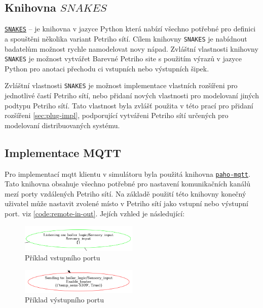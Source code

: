 \subsection{Knihovna $SNAKES$}

\href{https://www.ibisc.univ-evry.fr/~fpommereau/SNAKES/}{\texttt{SNAKES}} -- je knihovna v jazyce Python která nabízí všechno potřebné pro definici a spouštěni několika variant Petriho sítí. Cílem knihovny \texttt{SNAKES} je nabídnout badatelům možnost rychle namodelovat novy nápad. Zvláštní vlastnosti knihovny \texttt{SNAKES} je možnost vytvářet Barevné Petriho site s použitím výrazů v jazyce Python pro anotaci přechodu ci vstupních nebo výstupních šipek. \cite{snakes}

Zvláštní vlastnosti \texttt{SNAKES} je možnost implementace vlastních rozšířeni pro jednotlivé častí Petriho sítí, nebo přidaní nových vlastnosti pro modelovaní jiných podtypu Petriho sítí. Tato vlastnost byla zvlášť použita v této prací pro přidaní rozšířeni \ref{sec:plug-impl}, podporující vytvářeni Petriho sítí určených pro modelovaní distribuovaných systému.

\subsection{Implementace MQTT}
\label{subsec:mqtt_impl}
Pro implementací mqtt klientu v simulátoru byla použitá knihovna \href{https://pypi.org/project/paho-mqtt/}{\texttt{paho-mqtt}}. Tato knihovna obsahuje všechno potřebné pro nastavení komunikačních kanálů mezí porty vzdálených Petriho sítí. Na základě použití této knihovny konečný uživatel může nastavit zvolené místo v Petriho sítí jako vstupní nebo výstupní port. viz \ref{code:remote-in-out}. Jejích vzhled je následující:
\begin{figure}[hbt]
  \centering
  \includegraphics[width=0.5\textwidth]{obrazky-figures/port-in.png}
  \caption{Příklad vstupního portu}
  \label{port-in}
\end{figure}

\begin{figure}[hbt]
  \centering
  \includegraphics[width=0.5\textwidth]{obrazky-figures/port-out.png}
  \caption{Příklad výstupního portu}
  \label{port-out}
\end{figure}

